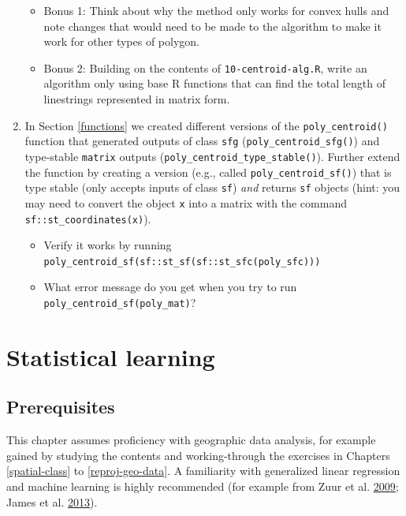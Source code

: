 \documentclass[]{krantz}
\providecommand{\tightlist}{%
  \setlength{\itemsep}{0pt}\setlength{\parskip}{0pt}}
\begin{document}
\begin{enumerate}
  \begin{itemize}
  \tightlist
  \item
    Bonus 1: Think about why the method only works for convex hulls and note changes that would need to be made to the algorithm to make it work for other types of polygon.
  \item
    Bonus 2: Building on the contents of \texttt{10-centroid-alg.R}, write an algorithm only using base R functions that can find the total length of linestrings represented in matrix form.
  \end{itemize}
\item
  In Section \ref{functions} we created different versions of the \texttt{poly\_centroid()} function that generated outputs of class \texttt{sfg} (\texttt{poly\_centroid\_sfg()}) and type-stable \texttt{matrix} outputs (\texttt{poly\_centroid\_type\_stable()}). Further extend the function by creating a version (e.g., called \texttt{poly\_centroid\_sf()}) that is type stable (only accepts inputs of class \texttt{sf}) \emph{and} returns \texttt{sf} objects (hint: you may need to convert the object \texttt{x} into a matrix with the command \texttt{sf::st\_coordinates(x)}).

  \begin{itemize}
  \tightlist
  \item
    Verify it works by running \texttt{poly\_centroid\_sf(sf::st\_sf(sf::st\_sfc(poly\_sfc)))}
  \item
    What error message do you get when you try to run \texttt{poly\_centroid\_sf(poly\_mat)}?
  \end{itemize}
\end{enumerate}

\hypertarget{spatial-cv}{%
\section{Statistical learning}\label{spatial-cv}}

\hypertarget{prerequisites-9}{%
\subsection*{Prerequisites}\label{prerequisites-9}}

This chapter assumes proficiency with geographic data analysis, for example gained by studying the contents and working-through the exercises in Chapters \ref{spatial-class} to \ref{reproj-geo-data}.
A familiarity with generalized linear regression and machine learning is highly recommended (for example from Zuur et al. \protect\hyperlink{ref-zuur_mixed_2009}{2009}; James et al. \protect\hyperlink{ref-james_introduction_2013}{2013}).
\end{document}
